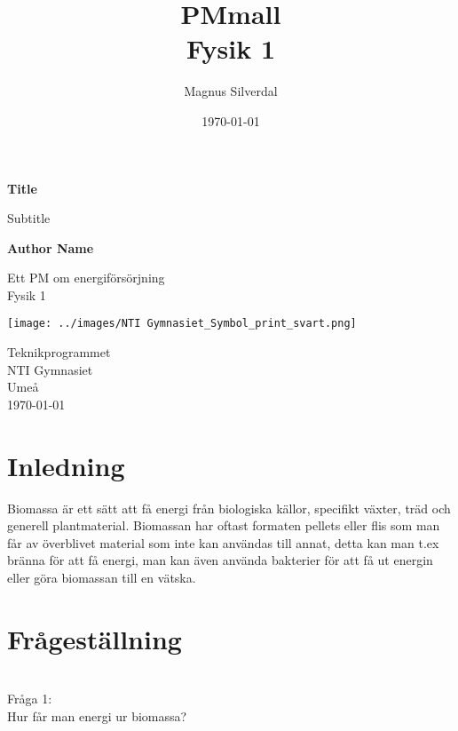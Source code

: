 \documentclass[11p]{article}
\title{PMmall \\ \small Fysik 1}
\author{Magnus Silverdal }
\date{\today}
\begin{document}
    \begin{titlepage}
        \begin{center}
            \vspace*{1cm}

            \Huge
            \textbf{Title}

            \vspace{0.5cm}
            \LARGE
            Subtitle

            \vspace{1.5cm}

            \textbf{Author Name}

            \vfill

            Ett PM om energiförsörjning \\
            Fysik 1

            \vspace{0.8cm}

            \texttt{[image: ../images/NTI Gymnasiet\_Symbol\_print\_svart.png]}

            \Large
            Teknikprogrammet\\
            NTI Gymnasiet\\
            Umeå\\
            \today

        \end{center}
    \end{titlepage}
    \tableofcontents
    \newpage
    \section{Inledning}
    Biomassa är ett sätt att få energi från biologiska källor, specifikt växter, träd och generell plantmaterial. Biomassan har oftast formaten pellets eller flis som man får av överblivet material som inte kan användas till annat, detta kan man t.ex bränna för att få energi, man kan även använda bakterier för att få ut energin eller göra biomassan till en vätska.


    \section{Frågeställning}


    \\Fråga 1:
    \\Hur får man energi ur biomassa?
\end{document}
